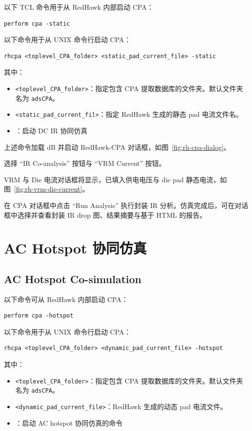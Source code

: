 以下 TCL 命令用于从 RedHawk 内部启动 CPA：
\begin{lstlisting}
perform cpa -static
\end{lstlisting}

以下命令用于从 UNIX 命令行启动 CPA：
\begin{lstlisting}
rhcpa <toplevel_CPA_folder> <static_pad_current_file> -static
\end{lstlisting}
其中：
\begin{itemize}
  \item \texttt{<toplevel\_CPA\_folder>}：指定包含 CPA 提取数据库的文件夹。默认文件夹名为 \texttt{adsCPA}。
  \item \texttt{<static\_pad\_current\_fil>}：指定 RedHawk 生成的静态 pad 电流文件名。
  \item {}：启动 DC IR 协同仿真
\end{itemize}

上述命令加载 dB 并启动 RedHawk-CPA 对话框，如图~\ref{fig:rh-cpa-dialog}。

\label{fig:rh-cpa-dialog}

选择 ``IR Co-analysis'' 按钮与 ``VRM Current'' 按钮。

VRM 与 Die 电流对话框将显示，已填入供电电压与 die pad 静态电流，如图~\ref{fig:rh-vrm-die-current}。

\label{fig:rh-vrm-die-current}

在 CPA 对话框中点击 ``Run Analysis'' 执行封装 IR 分析。仿真完成后，可在对话框中选择并查看封装 IR drop 图、结果摘要与基于 HTML 的报告。

\section{AC Hotspot 协同仿真}
\subsection*{AC Hotspot Co-simulation}

以下命令可从 RedHawk 内部启动 CPA：
\begin{lstlisting}
perform cpa -hotspot
\end{lstlisting}

以下命令用于从 UNIX 命令行启动 CPA：
\begin{lstlisting}
rhcpa <toplevel_CPA_folder> <dynamic_pad_current_file> -hotspot
\end{lstlisting}
其中：
\begin{itemize}
  \item \texttt{<toplevel\_CPA\_folder>}：指定包含 CPA 提取数据库的文件夹。默认文件夹名为 \texttt{adsCPA}。
  \item \texttt{<dynamic\_pad\_current\_file>}：RedHawk 生成的动态 pad 电流文件。
  \item {}：启动 AC hotspot 协同仿真的命令
\end{itemize}

